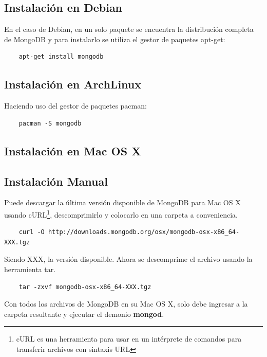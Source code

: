 \subsection*{Instalaci\'on en Debian}

En el caso de Debian, en un solo paquete se encuentra la distribuci\'on completa de MongoDB y para instalarlo se utiliza el gestor de paquetes apt-get:

\begin{lstlisting}
    apt-get install mongodb
\end{lstlisting}

\subsection*{Instalaci\'on en ArchLinux}

Haciendo uso del gestor de paquetes pacman:

\begin{lstlisting}
    pacman -S mongodb
\end{lstlisting}

\subsection{Instalaci\'on en Mac OS X}

\subsection*{Instalaci\'on Manual}

Puede descargar la \'ultima versi\'on disponible de MongoDB para Mac OS X usando cURL\footnote{cURL es una herramienta para usar en un intérprete de comandos para transferir archivos con sintaxis URL}, descomprimirlo y colocarlo en una carpeta a conveniencia.

\begin{lstlisting}
    curl -O http://downloads.mongodb.org/osx/mongodb-osx-x86_64-XXX.tgz
\end{lstlisting}

Siendo XXX, la versi\'on disponible. Ahora se descomprime el archivo usando la herramienta tar.

\begin{lstlisting}
    tar -zxvf mongodb-osx-x86_64-XXX.tgz
\end{lstlisting}

Con todos los archivos de MongoDB en su Mac OS X, solo debe ingresar a la carpeta resultante y ejecutar el demonio \textbf{mongod}.

